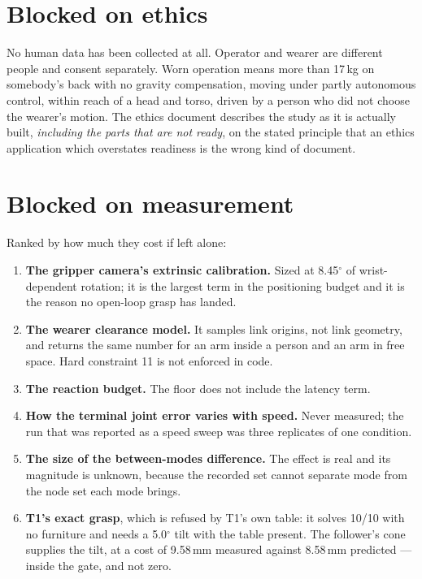 \documentclass[11pt,a4paper,oneside]{report}
\newcommand{\dg}{$^{\circ}$}
\begin{document}
\section{Blocked on ethics}

No human data has been collected at all. Operator and wearer are different
people and consent separately. Worn operation means more than 17\,kg on
somebody's back with no gravity compensation, moving under partly autonomous
control, within reach of a head and torso, driven by a person who did not
choose the wearer's motion. The ethics document describes the study as it is
actually built, \emph{including the parts that are not ready}, on the stated
principle that an ethics application which overstates readiness is the wrong
kind of document.

\section{Blocked on measurement}

Ranked by how much they cost if left alone:

\begin{enumerate}
\item \textbf{The gripper camera's extrinsic calibration.} Sized at 8.45\dg{}
      of wrist-dependent rotation; it is the largest term in the positioning
      budget and it is the reason no open-loop grasp has landed.
\item \textbf{The wearer clearance model.} It samples link origins, not link
      geometry, and returns the same number for an arm inside a person and an
      arm in free space. Hard constraint 11 is not enforced in code.
\item \textbf{The reaction budget.} The floor does not include the latency
      term.
\item \textbf{How the terminal joint error varies with speed.} Never measured;
      the run that was reported as a speed sweep was three replicates of one
      condition.
\item \textbf{The size of the between-modes difference.} The effect is real and
      its magnitude is unknown, because the recorded set cannot separate mode
      from the node set each mode brings.
\item \textbf{T1's exact grasp}, which is refused by T1's own table: it solves
      10/10 with no furniture and needs a 5.0\dg{} tilt with the table present.
      The follower's cone supplies the tilt, at a cost of 9.58\,mm measured
      against 8.58\,mm predicted --- inside the gate, and not zero.
\end{enumerate}
\end{document}
